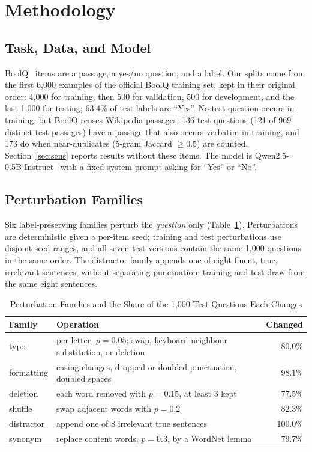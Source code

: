 \documentclass[conference]{IEEEtran}
\newcommand{\pfam}[1]{\textsf{#1}}
\begin{document}
\section{Methodology}
\label{sec:method}

\subsection{Task, Data, and Model}
BoolQ~\cite{clark2019boolq} items are a passage, a yes/no question, and a label. Our splits come from the first 6{,}000 examples of the official BoolQ training set, kept in their original order: 4{,}000 for training, then 500 for validation, 500 for development, and the last 1{,}000 for testing; 63.4\% of test labels are ``Yes''. No test question occurs in training, but BoolQ reuses Wikipedia passages: 136 test questions (121 of 969 distinct test passages) have a passage that also occurs verbatim in training, and 173 do when near-duplicates (5-gram Jaccard $\geq 0.5$) are counted. Section~\ref{sec:sens} reports results without these items. The model is Qwen2.5-0.5B-Instruct~\cite{qwen2025qwen25} with a fixed system prompt asking for ``Yes'' or ``No''.

\subsection{Perturbation Families}
Six label-preserving families perturb the \emph{question} only (Table~\ref{tab:families}). Perturbations are deterministic given a per-item seed; training and test perturbations use disjoint seed ranges, and all seven test versions contain the same 1{,}000 questions in the same order. The \pfam{distractor} family appends one of eight fluent, true, irrelevant sentences, without separating punctuation; training and test draw from the same eight sentences.

\begin{table}[t]
\centering
\caption{Perturbation Families and the Share of the 1{,}000 Test Questions Each Changes}
\label{tab:families}
\footnotesize
\setlength{\tabcolsep}{3pt}
\begin{tabular}{@{}l p{5.0cm} r@{}}
\toprule
Family & Operation & Changed \\
\midrule
\pfam{typo} & per letter, $p{=}0.05$: swap, keyboard-neighbour substitution, or deletion & 80.0\% \\
\pfam{formatting} & casing changes, dropped or doubled punctuation, doubled spaces & 98.1\% \\
\pfam{deletion} & each word removed with $p{=}0.15$, at least 3 kept & 77.5\% \\
\pfam{shuffle} & swap adjacent words with $p{=}0.2$ & 82.3\% \\
\pfam{distractor} & append one of 8 irrelevant true sentences & 100.0\% \\
\pfam{synonym} & replace content words, $p{=}0.3$, by a WordNet lemma~\cite{miller1995wordnet} & 79.7\% \\
\bottomrule
\end{tabular}
\end{table}
\end{document}

